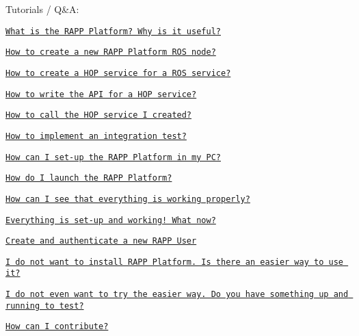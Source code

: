 Tutorials / Q\&A\-:
\begin{DoxyItemize}
\item \href{https://github.com/rapp-project/rapp-platform/wiki/What-is-the-RAPP-Platform%3F-Why-is-it-useful%3F}{\tt What is the R\-A\-P\-P Platform? Why is it useful?}
\item \href{https://github.com/rapp-project/rapp-platform/wiki/How-to-create-a-new-RAPP-Platform-ROS-node%3F}{\tt How to create a new R\-A\-P\-P Platform R\-O\-S node?}
\item \href{https://github.com/rapp-project/rapp-platform/wiki/How-to-create-a-HOP-service-for-a-ROS-service%3F}{\tt How to create a H\-O\-P service for a R\-O\-S service?}
\item \href{https://github.com/rapp-project/rapp-platform/wiki/How-to-write-the-API-for-a-HOP-service%3F}{\tt How to write the A\-P\-I for a H\-O\-P service?}
\item \href{https://github.com/rapp-project/rapp-platform/wiki/How-to-call-the-HOP-service-I-created%3F}{\tt How to call the H\-O\-P service I created?}
\item \href{https://github.com/rapp-project/rapp-platform/wiki/How-to-implement-an-integration-test%3F}{\tt How to implement an integration test?}
\item \href{https://github.com/rapp-project/rapp-platform/wiki/How-can-I-set-up-the-RAPP-Platform-in-my-PC%3F}{\tt How can I set-\/up the R\-A\-P\-P Platform in my P\-C?}
\item \href{https://github.com/rapp-project/rapp-platform/wiki/How-do-I-launch-the-RAPP-Platform%3F}{\tt How do I launch the R\-A\-P\-P Platform?}
\item \href{https://github.com/rapp-project/rapp-platform/wiki/How-can-I-see-that-everything-is-working-properly%3F}{\tt How can I see that everything is working properly?}
\item \href{https://github.com/rapp-project/rapp-platform/wiki/Everything-is-set-up-and-working!-What-now%3F}{\tt Everything is set-\/up and working! What now?}
\item \href{https://github.com/rapp-project/rapp-platform/wiki/Create-and-authenticate-a-new-RAPP-user}{\tt Create and authenticate a new R\-A\-P\-P User}
\item \href{https://github.com/rapp-project/rapp-platform/wiki/I-do-not-want-to-install-RAPP-Platform.-Is-there-an-easier-way-to-use-it%3F}{\tt I do not want to install R\-A\-P\-P Platform. Is there an easier way to use it?}
\item \href{https://github.com/rapp-project/rapp-platform/wiki/I-do-not-even-want-to-try-the-easier-way.-Do-you-have-something-up-and-running-to-test%3F}{\tt I do not even want to try the easier way. Do you have something up and running to test?}
\item \href{https://github.com/rapp-project/rapp-platform/wiki/How-can-I-contribute%3F}{\tt How can I contribute?} 
\end{DoxyItemize}